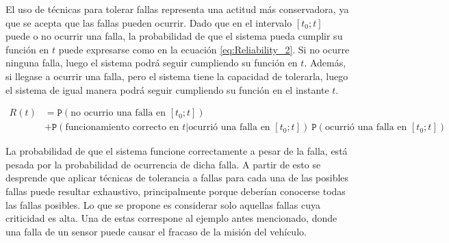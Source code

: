 El uso de técnicas para tolerar fallas representa una actitud más conservadora, ya que se acepta que las fallas pueden ocurrir. Dado que en el intervalo $[t_0;t]$ puede o no ocurrir una falla, la probabilidad de que el sistema pueda cumplir su función en $t$ puede expresarse como en la ecuación \eqref{eq:Reliability_2}. Si no ocurre ninguna falla, luego el sistema podrá seguir cumpliendo su función en $t$. Además, si llegase a ocurrir una falla, pero el sistema tiene la capacidad de tolerarla, luego el sistema de igual manera podrá seguir cumpliendo su función en el instante $t$.

\begin{equation}
    \begin{aligned}
        R(t) &= \mathtt{P}\left( \text{no ocurrio una falla en $[t_0;t]$} \right)\\ &+ \mathtt{P}\left( \text{funcionamiento correcto en $t$}|\text{ocurrió una falla en $[t_0;t]$} \right) \ \mathtt{P}\left( \text{ocurrió una falla en $[t_0;t]$} \right)
    \end{aligned}
    \label{eq:Reliability_2}
\end{equation}

La probabilidad de que el sistema funcione correctamente a pesar de la falla, está pesada por la probabilidad de ocurrencia de dicha falla. A partir de esto se desprende que aplicar técnicas de tolerancia a fallas para cada una de las posibles fallas puede resultar exhaustivo, principalmente porque deberían conocerse todas las fallas posibles. Lo que se propone es considerar solo aquellas fallas cuya criticidad es alta. Una de estas correspone al ejemplo antes mencionado, donde una falla de un sensor puede causar el fracaso de la misión del vehículo.



